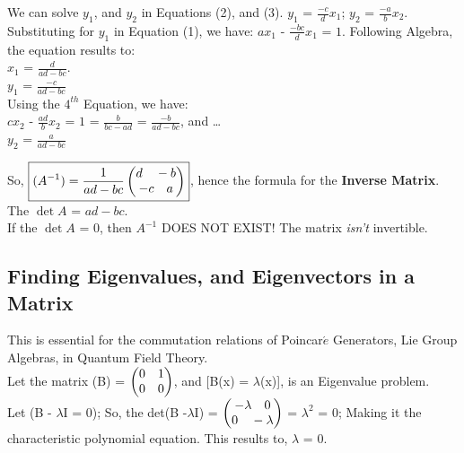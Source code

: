 \documentclass[a4paper, 10pt, onepage]{elegantbook}
\begin{document}
We can solve $y_1$, and $y_2$ in Equations (2), and (3). $y_1$ = $\frac{-c}{d} {x_1}$; $y_2$ = $\frac{-a}{b} {x_2}$.  \\

Substituting for $y_1$ in Equation (1), we have: $ax_1$ - $\frac{-bc}{d} {x_1}$ = $1$. Following Algebra, the equation results to:  \\

$x_1$ = $\frac{d}{ad - bc}$.  \\

$y_1$ = $\frac{-c}{ad - bc}$  \\

Using the $4^{th}$ Equation, we have:  \\

$cx_2$ - $\frac{ad}{b} {x_2}$ = $1$ = $\frac{b}{bc - ad}$ = $\frac{-b}{ad - bc}$, and \ldots  \\

$y_2$ = $\frac{a}{ad - bc}$

So, $\boxed{({A}^{-1}) = \frac{1}{ad - bc} \begin{pmatrix}d \quad -b \cr -c \quad a \end{pmatrix}}$, hence the formula for the \textbf{Inverse Matrix}.  \\

The $\det{A}$ = $ad - bc$. \\

If the $\det{A}$ = $0$, then $A^{-1}$ DOES NOT EXIST! The matrix \emph{isn't} invertible.

\subsection{Finding Eigenvalues, and Eigenvectors in a Matrix}

This is essential for the commutation relations of Poincar$\acute{e}$ Generators, Lie Group Algebras, in Quantum Field Theory.  \\

Let the matrix (B) =  $\begin{pmatrix}0 \quad 1 \cr 0 \quad 0 \end{pmatrix}$, and [B(x) = $\lambda$(x)], is an Eigenvalue problem.  \\

Let (B - $\lambda$I = 0); So, the det(B -$\lambda$I) = $\begin{pmatrix} - \lambda \quad 0 \cr 0 \quad - \lambda \end{pmatrix}$ = $\lambda^2$ = $0$; Making it the characteristic polynomial equation. This results to, $\lambda$ = $0$.  \\
\end{document}
